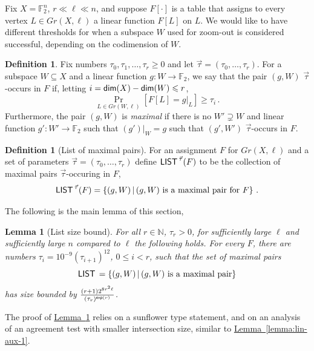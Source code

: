\documentclass[11pt]{article}
\numberwithin{equation}{section}
\newtheorem{lemma}[theorem]{Lemma}
\theoremstyle{definition}
\newtheorem{definition}[theorem]{Definition}
\theoremstyle{plain}
\newcommand{\expref}[2]{\hyperref[#2]{#1~\ref{#2}}}
\newcommand\Set[2]{ \left\{ #1 \,  \vert  \, #2\right\} }
\newcommand*\dimm{{\sf dim}}
\renewcommand\dim{\dimm}
\renewcommand\ge{\geqslant}
\renewcommand\le{\leqslant}
\renewcommand\subset{\subseteq}
\def\M{{\sf LIST\,}}
\def\F{\mathbb{F}}
\begin{document}
Fix $X = \F_2^n$,
$r\ll \ell \ll n$, and suppose $F[\cdot]$ is a table that assigns to
every vertex $L\in Gr(X,\ell)$ a linear function $F[L]$ on $L$. We
would like to have different thresholds for when a subspace $W$ used
for zoom-out is considered successful, depending on the codimension
of $W$.

%
\begin{definition}
  Fix numbers $\tau_0,\tau_1,\ldots,\tau_r\ge 0$ and let
  $\vec\tau=(\tau_0,\ldots,\tau_r)$. For a subspace $W\subset X$ and a
  linear function $g:W\to\F_2$, we say that the pair $(g,W)$
  $\vec\tau$-occurs in $F$ if, %
  letting
  $i = \dim(X) - \dim(W)\le r$,
\[  \Pr_{L\in Gr(W,\ell)}[F[L] = g|_L] \ge \tau_i \,.
\]
Furthermore, the pair $(g,W)$ is {\em maximal} if there is no $W'\supsetneq W$ and linear function $g':W'\to\F_2$ such that $(g')|_W=g$ such that $(g',W')$ $\vec\tau$-occurs in $F$.
\end{definition}
%
%
%
\begin{definition}[List of maximal pairs]\label{def:Mlist}  %
For an assignment $F$ for $Gr(X,\ell)$ and a set of parameters $\vec\tau=(\tau_0,\ldots,\tau_r)$ define $\M^{\vec\tau}(F)$ to be the collection of maximal pairs $\vec\tau$-occuring in $F$,
\[ \M^{\vec\tau}(F) = \Set{(g,W)}{ (g,W)\hbox{ is a maximal pair for }F}\,.
\]
\end{definition}
%
The following is the main lemma of this section,
%
\begin{lemma}[List size bound]\label{lemma:list-dec}  %
For all $r\in\mathbb{N}$, $\tau_r>0$, for sufficiently large $\ell$ and sufficiently large $n$ compared to $\ell$ the following holds.
For every $F$, there are numbers $\tau_i = 10^{-9} (\tau_{i+1})^{12}$, $0\le i < r$, such that the set of maximal pairs
\[ \M = \Set{(g,W)}{ (g,W)\hbox{ is a maximal pair}}
\]
has size bounded by $\frac{(r+1)2^{8r^2\ell}}{(\tau_r)^{{\sf exp}(r)}}$.
\end{lemma}
%
The proof of \expref{Lemma}{lemma:list-dec} relies on a sunflower type statement, and on an analysis of an agreement test with smaller intersection size, similar to \expref{Lemma}{lemma:lin-aux-1}.
\end{document}
